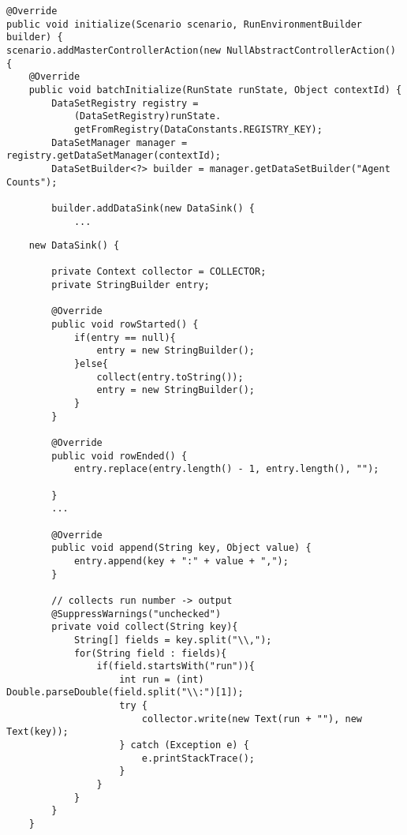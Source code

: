 \documentclass[11pt]{amsart}
\begin{document}
\begin{enumerate}
\noindent\begin{minipage}[h]{\textwidth}
\vspace{.2in}
\lstset{language=java,caption=Adding the Controller Action with a ModelInitializer,label=lst:batchInit}
\begin{lstlisting}
@Override
public void initialize(Scenario scenario, RunEnvironmentBuilder builder) {
scenario.addMasterControllerAction(new NullAbstractControllerAction() {
	@Override
	public void batchInitialize(RunState runState, Object contextId) {
		DataSetRegistry registry = 
			(DataSetRegistry)runState.
			getFromRegistry(DataConstants.REGISTRY_KEY);
		DataSetManager manager = registry.getDataSetManager(contextId);
		DataSetBuilder<?> builder = manager.getDataSetBuilder("Agent Counts");
		
		builder.addDataSink(new DataSink() {
			...
\end{lstlisting}
\vspace{.2in}
\end{minipage}

\noindent\begin{minipage}[h]{\textwidth}
\vspace{.2in}
\lstset{language=java,caption=Collecting the Data with a Custom DataSink,label=lst:datasink}
\begin{lstlisting}
	new DataSink() {
					
		private Context collector = COLLECTOR;
		private StringBuilder entry;
							
		@Override
		public void rowStarted() {
			if(entry == null){
				entry = new StringBuilder();
			}else{
				collect(entry.toString());
				entry = new StringBuilder();
			}
		}
		
		@Override
		public void rowEnded() {
			entry.replace(entry.length() - 1, entry.length(), "");
			
		}
		...
		
		@Override
		public void append(String key, Object value) {
			entry.append(key + ":" + value + ",");
		}
		
		// collects run number -> output
		@SuppressWarnings("unchecked")
		private void collect(String key){
			String[] fields = key.split("\\,");
			for(String field : fields){
				if(field.startsWith("run")){
					int run = (int) Double.parseDouble(field.split("\\:")[1]);
					try {
						collector.write(new Text(run + ""), new Text(key));
					} catch (Exception e) {
						e.printStackTrace();
					}
				}
			}
		}
	}


\end{lstlisting}
\end{minipage}
\end{enumerate}
\end{document}
